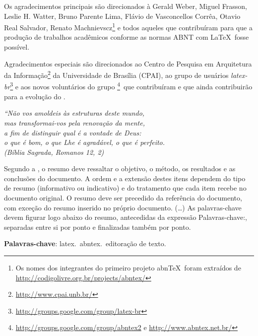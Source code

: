\begin{agradecimentos}
Os agradecimentos principais são direcionados à Gerald Weber, Miguel Frasson,
Leslie H. Watter, Bruno Parente Lima, Flávio de Vasconcellos Corrêa, Otavio Real
Salvador, Renato Machnievscz\footnote{Os nomes dos integrantes do primeiro
  projeto abn\TeX\ foram extraídos de
  \url{http://codigolivre.org.br/projects/abntex/}} e todos aqueles que
contribuíram para que a produção de trabalhos acadêmicos conforme
as normas ABNT com \LaTeX\ fosse possível.

Agradecimentos especiais são direcionados ao Centro de Pesquisa em Arquitetura
da Informação\footnote{\url{http://www.cpai.unb.br/}} da Universidade de
Brasília (CPAI), ao grupo de usuários
\emph{latex-br}\footnote{\url{http://groups.google.com/group/latex-br}} e aos
novos voluntários do grupo
\emph{\abnTeX}\footnote{\url{http://groups.google.com/group/abntex2} e
  \url{http://www.abntex.net.br/}}~que contribuíram e que ainda
contribuirão para a evolução do \abnTeX.

\end{agradecimentos}

\begin{epigrafe}
\vspace*{\fill}
\begin{flushright}
  \textit{``Não vos amoldeis às estruturas deste mundo, \\
    mas transformai-vos pela renovação da mente, \\
    a fim de distinguir qual é a vontade de Deus: \\
    o que é bom, o que Lhe é agradável, o que é perfeito.\\
    (Bíblia Sagrada, Romanos 12, 2)}
\end{flushright}
\end{epigrafe}


\setlength{\absparsep}{18pt} %
\begin{resumo}
Segundo a , o resumo deve ressaltar o
objetivo, o método, os resultados e as conclusões do documento. A ordem e a extensão
destes itens dependem do tipo de resumo (informativo ou indicativo) e do
tratamento que cada item recebe no documento original. O resumo deve ser
precedido da referência do documento, com exceção do resumo inserido no
próprio documento. (\ldots) As palavras-chave devem figurar logo abaixo do
resumo, antecedidas da expressão Palavras-chave:, separadas entre si por
ponto e finalizadas também por ponto.

\textbf{Palavras-chave}: latex.\ abntex.\ editoração de texto.
\end{resumo}

